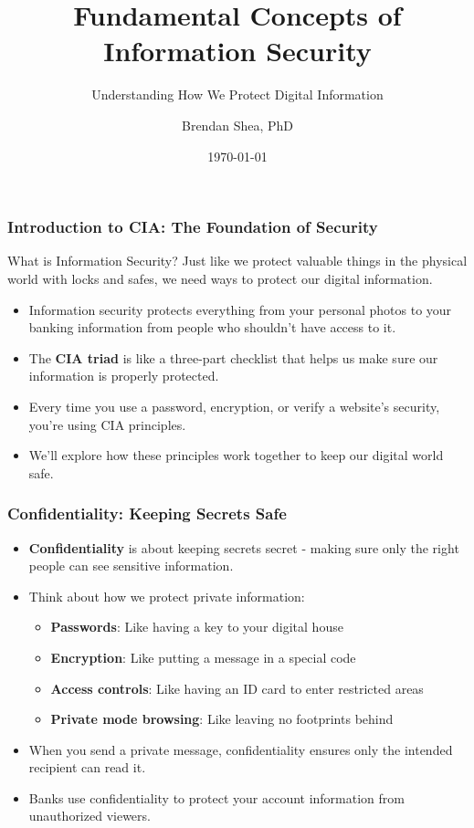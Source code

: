 \documentclass{beamer}
\title{Fundamental Concepts of Information Security}
\subtitle{Understanding How We Protect Digital Information}
\author{Brendan Shea, PhD}
\date{\today}
\begin{document}
\begin{frame}
    \titlepage
\end{frame}

\begin{frame}
    \frametitle{Introduction to CIA: The Foundation of Security}
    \begin{block}{What is Information Security?}
        Just like we protect valuable things in the physical world with locks and safes, we need ways to protect our digital information.
    \end{block}
    \begin{itemize}
        \item Information security protects everything from your personal photos to your banking information from people who shouldn't have access to it.
        \item The \textbf{CIA triad} is like a three-part checklist that helps us make sure our information is properly protected.
        \item Every time you use a password, encryption, or verify a website's security, you're using CIA principles.
        \item We'll explore how these principles work together to keep our digital world safe.
    \end{itemize}
\end{frame}

\begin{frame}
    \frametitle{Confidentiality: Keeping Secrets Safe}
    \begin{itemize}
        \item \textbf{Confidentiality} is about keeping secrets secret - making sure only the right people can see sensitive information.
        \item Think about how we protect private information:
            \begin{itemize}
                \item \textbf{Passwords}: Like having a key to your digital house
                \item \textbf{Encryption}: Like putting a message in a special code
                \item \textbf{Access controls}: Like having an ID card to enter restricted areas
                \item \textbf{Private mode browsing}: Like leaving no footprints behind
            \end{itemize}
        \item When you send a private message, confidentiality ensures only the intended recipient can read it.
        \item Banks use confidentiality to protect your account information from unauthorized viewers.
    \end{itemize}
\end{frame}
\end{document}
